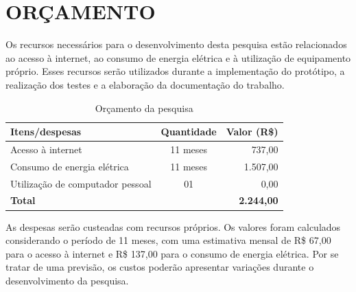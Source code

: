

\chapter{ORÇAMENTO}

Os recursos necessários para o desenvolvimento desta pesquisa estão relacionados ao acesso à internet, ao consumo de energia elétrica e à utilização de equipamento próprio. Esses recursos serão utilizados durante a implementação do protótipo, a realização dos testes e a elaboração da documentação do trabalho.

\begin{table}[htb]
    \centering
    \caption{Orçamento da pesquisa}
    \label{tab:orcamento-pesquisa}
    \begin{tabular}{|p{7cm}|c|r|}
        \hline
        \textbf{Itens/despesas} & \textbf{Quantidade} & \textbf{Valor (R\$)} \\ \hline
        Acesso à internet & 11 meses & 737,00 \\ \hline
        Consumo de energia elétrica & 11 meses & 1.507,00 \\ \hline
        Utilização de computador pessoal & 01 & 0,00 \\ \hline
        \multicolumn{2}{|l|}{\textbf{Total}} & \textbf{2.244,00} \\ \hline
    \end{tabular}

\end{table}

As despesas serão custeadas com recursos próprios. Os valores foram calculados considerando o período de 11 meses, com uma estimativa mensal de R\$ 67,00 para o acesso à internet e R\$ 137,00 para o consumo de energia elétrica. Por se tratar de uma previsão, os custos poderão apresentar variações durante o desenvolvimento da pesquisa.